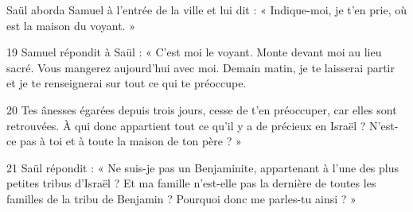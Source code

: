 Saül aborda Samuel à l’entrée de la ville et lui dit : « Indique-moi, je t’en prie, où est la maison du voyant. »

19 Samuel répondit à Saül : « C’est moi le voyant. Monte devant moi au lieu sacré. Vous mangerez aujourd’hui avec moi. Demain matin, je te laisserai partir et je te renseignerai sur tout ce qui te préoccupe.

20 Tes ânesses égarées depuis trois jours, cesse de t’en préoccuper, car elles sont retrouvées. À qui donc appartient tout ce qu’il y a de précieux en Israël ? N’est-ce pas à toi et à toute la maison de ton père ? »

21 Saül répondit : « Ne suis-je pas un Benjaminite, appartenant à l’une des plus petites tribus d’Israël ? Et ma famille n’est-elle pas la dernière de toutes les familles de la tribu de Benjamin ? Pourquoi donc me parles-tu ainsi ? »
